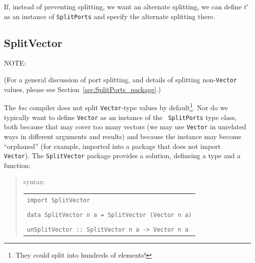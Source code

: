 If, instead of preventing splitting, we want an alternate splitting,
we can define $t'$ as an instance of {\tt SplitPorts} and specify the
alternate splitting there.


\subsection{SplitVector}

\label{sec:SplitVector_package}


NOTE: \hfill {}

(For a general discussion of port splitting, and details of splitting
non-{\tt Vector} values, please see
Section~\ref{sec:SplitPorts_package}.)

The \emph{bsc} compiler does not split {\tt Vector}-type values by
default\footnote{They could split into hundreds of elements!}.  Nor do
we typically want to define {\tt Vector} as an instance of the {\tt
  SplitPorts} type class, both because that may cover too many vectors
(we may use {\tt Vector} in unrelated ways in different arguments and
results) and because the instance may become ``orphaned'' (for
example, imported into a package that does not import {\tt
  Vector}). The {\tt SplitVector} package provides a solution,
defineing a type and a function:
\begin{quote}
  {\BHb} syntax:
  \hspace*{1em}\begin{tabular}[t]{l}
    {\tt import SplitVector} \\
    \\
    {\tt data SplitVector n a = SplitVector (Vector n a)} \\
    \\
    {\tt unSplitVector :: SplitVector n a -> Vector n a}
  \end{tabular}
\end{quote}

